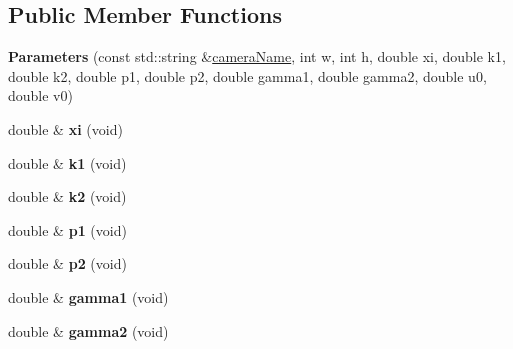 \subsection*{Public Member Functions}
\begin{DoxyCompactItemize}
\item 
\mbox{\label{classcamodocal_1_1CataCamera_1_1Parameters_a4d339e0ac5317e786e1d6d635332123b}} 
{\bfseries Parameters} (const std\+::string \&\hyperlink{classcamodocal_1_1Camera_1_1Parameters_ad5d799e6367c5605907a941b2271e271}{camera\+Name}, int w, int h, double xi, double k1, double k2, double p1, double p2, double gamma1, double gamma2, double u0, double v0)
\item 
\mbox{\label{classcamodocal_1_1CataCamera_1_1Parameters_addf812af318dde7bc856159d370dfc8e}} 
double \& {\bfseries xi} (void)
\item 
\mbox{\label{classcamodocal_1_1CataCamera_1_1Parameters_aedfef0286f33d73a281159db585c29d3}} 
double \& {\bfseries k1} (void)
\item 
\mbox{\label{classcamodocal_1_1CataCamera_1_1Parameters_a60507979acca10311de43bd196544ec5}} 
double \& {\bfseries k2} (void)
\item 
\mbox{\label{classcamodocal_1_1CataCamera_1_1Parameters_ab39ed7572a6df2f20ed71cfafc0a8bde}} 
double \& {\bfseries p1} (void)
\item 
\mbox{\label{classcamodocal_1_1CataCamera_1_1Parameters_af8eb3e2096c2892e728961299c463f9b}} 
double \& {\bfseries p2} (void)
\item 
\mbox{\label{classcamodocal_1_1CataCamera_1_1Parameters_a459d8b0938b88223e8e52b2b57f28b8b}} 
double \& {\bfseries gamma1} (void)
\item 
\mbox{\label{classcamodocal_1_1CataCamera_1_1Parameters_a3e607d6b1bb039e3994f0ab2afeb8d52}} 
double \& {\bfseries gamma2} (void)

\end{DoxyCompactItemize}
